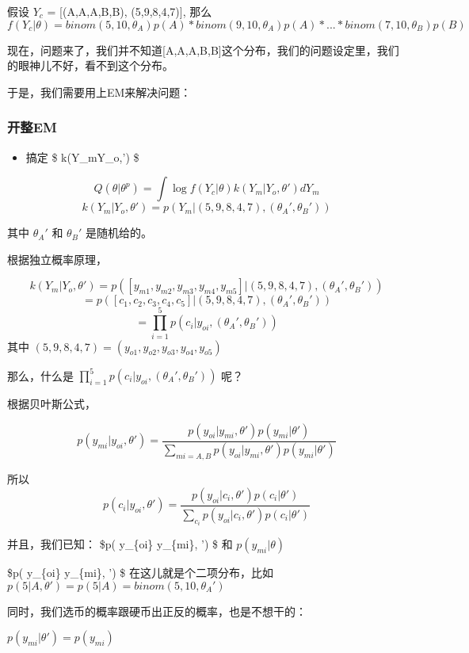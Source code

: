 \documentclass[11pt]{article}
\providecommand{\tightlist}{%
      \setlength{\itemsep}{0pt}\setlength{\parskip}{0pt}}
\begin{document}
假设 \(Y_c\) = {[}(A,A,A,B,B), (5,9,8,4,7){]}, 那么
\[f(Y_c|\theta) = binom(5,10,\theta_A)p(A) * binom(9,10,\theta_A)p(A) * ... * binom(7,10,\theta_B)p(B)\]

现在，问题来了，我们并不知道{[}A,A,A,B,B{]}这个分布，我们的问题设定里，我们的眼神儿不好，看不到这个分布。

于是，我们需要用上EM来解决问题：

    \subsubsection{开整EM}\label{ux5f00ux6574em}

\begin{itemize}
\tightlist
\item
  搞定 \$ k(Y\_m\textbar{}Y\_o,\theta') \$
\end{itemize}

\[Q(\theta | \theta^{p}) =\int \log f(Y_c|\theta) k(Y_m|Y_o,\theta') dY_m \]\[k(Y_m|Y_o,\theta') = p(Y_m | (5,9,8,4,7), (\theta_A', \theta_B'))\]

其中 \(\theta_A'\) 和 \(\theta_B'\) 是随机给的。

根据独立概率原理，

\[k(Y_m|Y_o,\theta') = p([y_{m1},y_{m2},y_{m3},y_{m4},y_{m5}]| (5,9,8,4,7), (\theta_A', \theta_B'))\]
\[ = p([c_{1},c_{2},c_{3},c_{4},c_{5}]| (5,9,8,4,7), (\theta_A', \theta_B'))\]
\[= \prod_{i=1}^5 p(c_{i}| y_{oi}, (\theta_A', \theta_B'))\] 其中
\((5,9,8,4,7) = (y_{o1}, y_{o2}, y_{o3},y_{o4},y_{o5})\)

那么，什么是 \(\prod_{i=1}^5 p(c_{i}| y_{oi}, (\theta_A', \theta_B'))\)
呢？

根据贝叶斯公式，

\[p(y_{mi}|y_{oi},\theta') = \frac{ p( y_{oi} | y_{mi}, \theta') p(y_{mi} | \theta')}{ \sum_{mi = A,B} p( y_{oi} | y_{mi}, \theta') p(y_{mi} | \theta')}\]

所以
\[p(c_{i}|y_{oi},\theta') = \frac{ p( y_{oi} | c_{i}, \theta') p(c_{i} | \theta')}{ \sum_{c_i} p( y_{oi} | c_{i}, \theta') p(c_{i} | \theta')}\]

并且，我们已知： \$p( y\_\{oi\} \textbar{} y\_\{mi\}, \theta') \$ 和
\(p(y_{mi} | \theta)\)

\$p( y\_\{oi\} \textbar{} y\_\{mi\}, \theta') \$
在这儿就是个二项分布，比如
\(p(5 | A, \theta') = p(5|A) = binom(5,10,\theta_A')\)

同时，我们选币的概率跟硬币出正反的概率，也是不想干的：

\(p(y_{mi} |\theta') = p(y_{mi})\)
\end{document}
